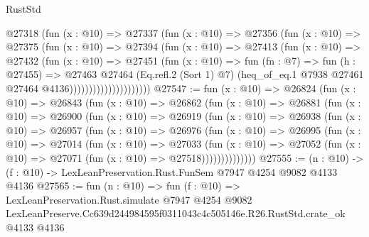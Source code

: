 \begin{lexlean}{RustStd}
\begin{coremodule}
                          @27318
                            (fun (x : @10) =>
                            @27337
                              (fun (x : @10) =>
                              @27356
                                (fun (x : @10) =>
                                @27375
                                  (fun (x : @10) =>
                                  @27394
                                    (fun (x : @10) =>
                                    @27413
                                      (fun (x : @10) =>
                                      @27432
                                        (fun (x : @10) =>
                                        @27451
                                          (fun (x : @10) =>
                                          fun (fn : @7) =>
                                          fun (h : @27455) =>
                                          @27463
                                            @27464
                                            (Eq.refl.{2} (Sort 1) @7)
                                            (heq_of_eq.{1}
                                              @7938
                                              @27461
                                              @27464
                                              @4136)))))))))))))))))))))
@27547 := fun (x : @10) =>
  @26824
    (fun (x : @10) =>
    @26843
      (fun (x : @10) =>
      @26862
        (fun (x : @10) =>
        @26881
          (fun (x : @10) =>
          @26900
            (fun (x : @10) =>
            @26919
              (fun (x : @10) =>
              @26938
                (fun (x : @10) =>
                @26957
                  (fun (x : @10) =>
                  @26976
                    (fun (x : @10) =>
                    @26995
                      (fun (x : @10) =>
                      @27014
                        (fun (x : @10) =>
                        @27033
                          (fun (x : @10) =>
                          @27052 (fun (x : @10) => @27071 (fun (x : @10) => @27518))))))))))))))
@27555 := (n : @10) -> (f : @10) -> LexLeanPreservation.Rust.FunSem @7947 @4254 @9082 @4133 @4136
@27565 := fun (n : @10) =>
  fun (f : @10) =>
  LexLeanPreservation.Rust.simulate
    @7947
    @4254
    @9082
    LexLeanPreserve.Cc639d244984595f0311043c4c505146e.R26.RustStd.crate_ok
    @4133
    @4136
\end{coremodule}
\end{lexlean}
